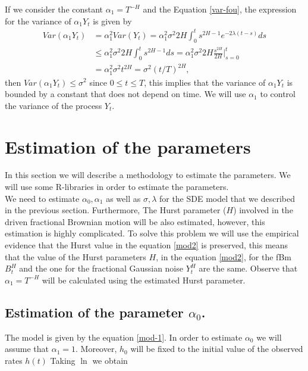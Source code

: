 \documentclass[smallextended]{svjour3}
\begin{document}
If we consider the constant $\alpha_1 = T^{-H}$ and the Equation 
\eqref{var-fou},
the expression for the variance of $\alpha_1 Y_t$ is given by
\begin{align}
Var(\alpha_1 Y_t)&= \alpha_1^2 Var(Y_t)= \alpha_1^2\sigma^2 2H  \int_0^t 
s^{2H-1} e^{-2\lambda (t-s)} ds\nonumber
\\
&\le \alpha_1^2 \sigma^2 2H  \int_0^t s^{2H-1} ds= \alpha_1^2 \sigma^2 2H  
\frac{s^{2H}}{2H}\Big|_{s=0}^t \nonumber
\\
&= \alpha_1^2 \sigma^2 t^{2H} = \sigma^2 (t/T)^{2H},\label{var-fou1}
\end{align}
then $Var(\alpha_1 Y_t)\le \sigma^2 $ since $0\le t\le T$, this implies that 
the variance of $\alpha_1 Y_t$
is bounded by a constant that does not depend on time. We will use $\alpha_1$  
to control the variance of the process $Y_t$.



\section{Estimation of the parameters}
\label{esti}

In this section we will describe a methodology to estimate the parameters.
We will use some R-libraries in order to estimate the parameters. \\

We need to estimate $\alpha_0, \alpha_1$ as well as $\sigma,\lambda$ for the 
SDE model that we described in the previous section. Furthermore,
The Hurst parameter ($H$) involved in the driven fractional Brownian motion 
will be also estimated, however, this estimation is highly complicated.
To solve this problem we will use the empirical evidence that the Hurst value 
in the equation \eqref{mod2}
is preserved, this means that the  value of the  Hurst parameters $H$, in the 
equation \eqref{mod2}, for the fBm $B_t^H$ and the one for the
fractional Gaussian noise $Y_t^H$ are the same. Observe that $\alpha_1=T^{-H}$ 
will be calculated using the estimated Hurst parameter.






\subsection{Estimation of the parameter $\alpha_0$.}


The model is given by the equation \eqref{mod-1}. In order to estimate 
$\alpha_0$ we will assume that $\alpha_1=1$. Moreover, $h_0$ will be fixed to 
the initial value of the observed rates $h(t)$ Taking $\ln$ we obtain
\end{document}

